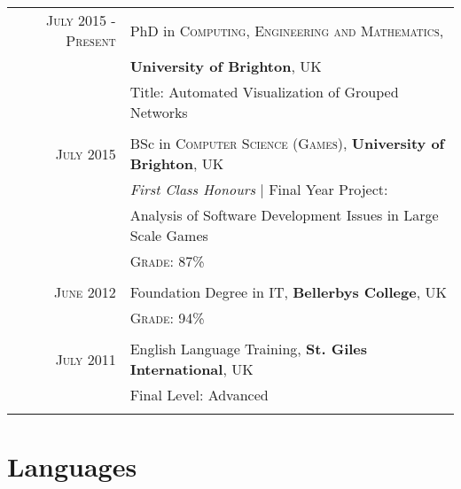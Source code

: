 \documentclass[a4paper,11pt]{article} %
\begin{document}
\begin{tabular}{r|p{11cm}}
\textsc{July 2015 - Present} & PhD in \textsc{Computing, Engineering and Mathematics},\\
& \textbf{University of Brighton}, UK\\
& Title: Automated Visualization of Grouped Networks\\
\multicolumn{2}{c}{} \\

	
\textsc{July} 2015 & BSc in \textsc{Computer Science (Games)}, \textbf{University of Brighton}, UK\\
& \emph{First Class Honours} | Final Year Project: \\
& Analysis of Software Development Issues in Large Scale Games\\
&\normalsize \textsc{Grade}: 87\% \\
\multicolumn{2}{c}{} \\


\textsc{June} 2012 & Foundation Degree in \textsc{IT}, \normalsize\textbf{Bellerbys College}, UK\\
&\normalsize \textsc{Grade}: 94\% \\
\multicolumn{2}{c}{} \\


\textsc{July} 2011 & English Language Training, \textbf{St. Giles International}, UK \\
& Final Level: Advanced\\
\multicolumn{2}{c}{} \\

\end{tabular}
\vspace{1cm}




\section{Languages}
\end{document}
